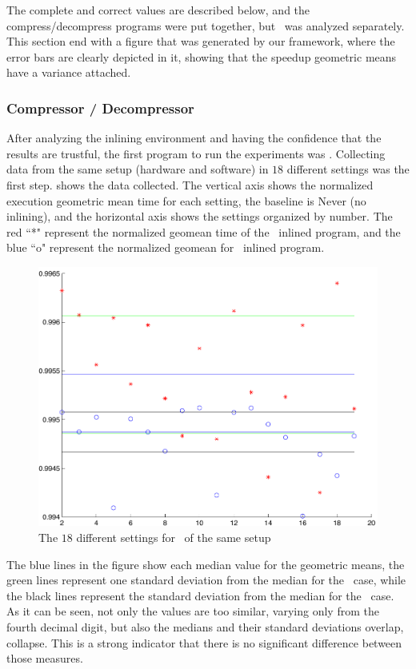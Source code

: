 The complete and correct values are described below, and the compress/decompress programs were put together, but \gcc\ was analyzed separately. This section end with a figure that was generated by our framework, where the error bars are clearly depicted in it, showing that the speedup geometric means have a variance attached.

\subsubsection{Compressor / Decompressor}

After analyzing the inlining environment and having the confidence that the results are trustful, the first program to run the experiments was \bzip. Collecting data from the same setup (hardware and software) in $18$ different settings was the first step.  shows the data collected. The vertical axis shows the normalized execution geometric mean time for each setting, the baseline is Never (no inlining), and the horizontal axis shows the settings organized by number. The red ``*" represent the normalized geomean time of the \FDI\ inlined program, and the blue ``o" represent the normalized geomean for \llvm\ inlined program.

\begin{figure}
  \centering
  \includegraphics[width=1.00\linewidth]{Figures/fdllrep}
  \caption{The $18$ different settings for \bzip\ of the same setup}
  \label{fig:fdllrep}
\end{figure}

The blue lines in the figure show each median value for the geometric means, the green lines represent one standard deviation from the median for the \FDI\ case, while the black lines represent the standard deviation from the median for the \llvm\ case. As it can be seen, not only the values are too similar, varying only from the fourth decimal digit, but also the medians and their standard deviations overlap, collapse. This is a strong indicator that there is no significant difference between those measures.

